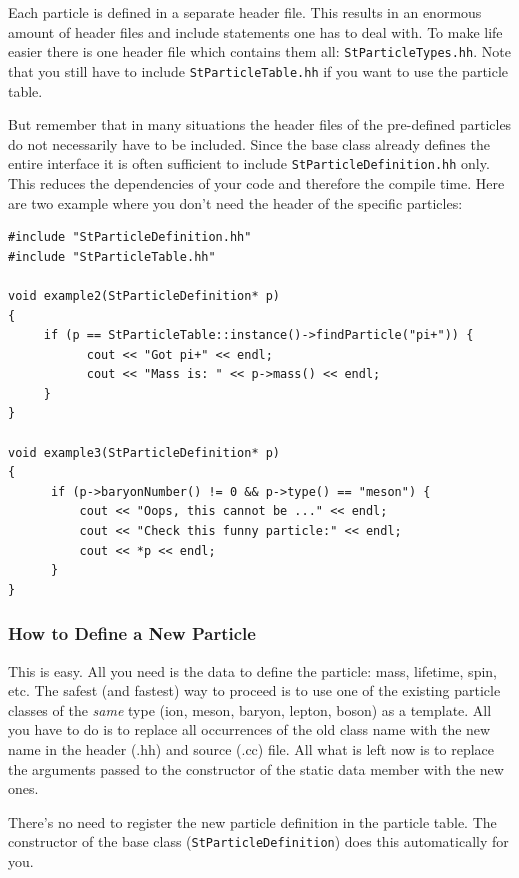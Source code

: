 \documentclass[twoside]{article}
\newcommand{\comp}[1]{\texttt{#1}}%
\begin{document}
\begin{description}
Each particle is defined in a separate header file.
This results in an enormous amount of header files and include statements
one has to deal with. To make life easier there is one header file which contains
them all: \comp{StParticleTypes.hh}. Note that you still have to include
\comp{StParticleTable.hh} if you want to use the particle table.


But remember that in many situations the header files of the pre-defined particles
do not necessarily have to be included. Since the base class already defines the
entire interface it is often sufficient to include \comp{StParticleDefinition.hh} only. This
reduces the dependencies of your code and therefore the compile time.
Here are two example where you don't need the header of the specific particles: 

{\footnotesize
\begin{verbatim}
#include "StParticleDefinition.hh"
#include "StParticleTable.hh"

void example2(StParticleDefinition* p)
{
     if (p == StParticleTable::instance()->findParticle("pi+")) {
           cout << "Got pi+" << endl;
           cout << "Mass is: " << p->mass() << endl;
     }
}

void example3(StParticleDefinition* p)
{
      if (p->baryonNumber() != 0 && p->type() == "meson") {
          cout << "Oops, this cannot be ..." << endl;
          cout << "Check this funny particle:" << endl;
          cout << *p << endl;
      }
}
\end{verbatim}
}

\subsubsection{How to Define a New Particle}

This is easy. All you need is the data to define the particle: mass,
lifetime, spin, etc.  The safest (and fastest) way to proceed is to
use one of the existing particle classes of the \emph{same} type (ion,
meson, baryon, lepton, boson) as a template. All you have to do is to
replace all occurrences of the old class name with the new name in the
header (.hh) and source (.cc) file.  All what is left now is to
replace the arguments passed to the constructor of the static data
member with the new ones.

There's no need to register the new particle definition in the
particle table. The constructor of the base class
(\comp{StParticleDefinition}) does this automatically for you.


\end{description}
\end{document}
